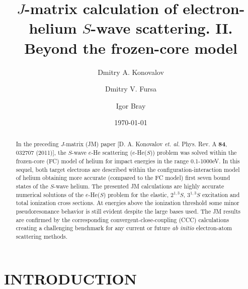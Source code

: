 \documentclass[aip
, pra
, showpacs
, aps
, twocolumn
, groupedaddress
, floatfix
]{revtex4}
\begin{document}
\title {$J$-matrix calculation of electron-helium $S$-wave scattering. II. Beyond the frozen-core model}

\author{Dmitry A. Konovalov}

\author{Dmitry V. Fursa}

\author{Igor Bray}



\date{\today}

\begin{abstract}

In the preceding $J$-matrix (JM) paper [D. A. Konovalov {\em et. al.} Phys. Rev. A {\bf 84}, 032707 (2011)],
the $S$-wave $e$-He scattering ($e$-He($S$)) problem was solved within the frozen-core (FC) model of helium for impact energies in the range 0.1-1000eV.
In this sequel, both target electrons are described within the configuration-interaction model of helium obtaining  more accurate (compared to the FC model)
first seven bound states of the $S$-wave helium.
The presented JM calculations are highly accurate numerical solutions of the
$e$-He($S$) problem
for the elastic, $2^{1,3}S$, $3^{1,3}S$ excitation and total ionization cross sections.
At energies above the ionization threshold some minor pseudoresonance behavior is still evident despite the large bases used.
The JM results are confirmed by the corresponding convergent-close-coupling (CCC) calculations creating a challenging benchmark
for any current or future {\it ab initio} electron-atom scattering methods.



\end{abstract}

\maketitle



\section{INTRODUCTION}
\end{document}
